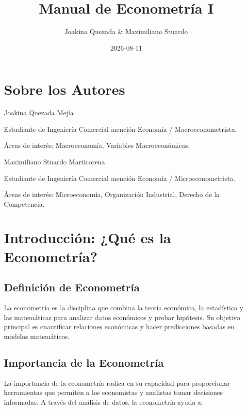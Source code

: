 \documentclass[
]{book}
\title{Manual de Econometría I}
\author{Joakina Quezada \& Maximiliano Stuardo}
\date{2026-08-11}
\begin{document}
\maketitle

{
\setcounter{tocdepth}{1}
\tableofcontents
}
\chapter*{Sobre los Autores}\label{sobre-los-autores}

Joakina Quezada Mejía

Estudiante de Ingeniería Comercial mención Economía / Macroeconometrista.

Áreas de interés: Macroeconomía, Variables Macroeconómicas.

Maximiliano Stuardo Marticorena

Estudiante de Ingeniería Comercial mención Economía / Microeconometrista.

Áreas de interés: Microeconomía, Organización Industrial, Derecho de la Competencia.

\chapter*{Introducción: ¿Qué es la Econometría?}\label{introducciuxf3n-quuxe9-es-la-econometruxeda}

\section{Definición de Econometría}\label{definiciuxf3n-de-econometruxeda}

La econometría es la disciplina que combina la teoría económica, la estadística y las matemáticas para analizar datos económicos y probar hipótesis. Su objetivo principal es cuantificar relaciones económicas y hacer predicciones basadas en modelos matemáticos.

\section{Importancia de la Econometría}\label{importancia-de-la-econometruxeda}

La importancia de la econometría radica en su capacidad para proporcionar herramientas que permiten a los economistas y analistas tomar decisiones informadas. A través del análisis de datos, la econometría ayuda a:
\end{document}
